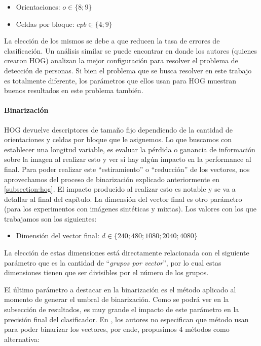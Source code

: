 	\begin{itemize}
		\item Orientaciones: $ o \in \{8; 9\}$
		\item Celdas por bloque: $ cpb \in \{4; 9\}$
	\end{itemize}
	
	La elección de los mismos se debe a que reducen la tasa de errores de clasificación. Un análisis similar se puede encontrar en \cite{DT05} donde los autores (quienes crearon HOG) analizan la mejor configuración para resolver el problema de detección de personas. Si bien el problema que se busca resolver en este trabajo es totalmente diferente, los parámetros que ellos usan para HOG muestran buenos resultados en este problema también.

	\paragraph{Binarización}

	HOG devuelve descriptores de tamaño fijo dependiendo de la cantidad de orientaciones y celdas por bloque que le asignemos. Lo que buscamos con establecer una longitud variable, es evaluar la pérdida o ganancia de información sobre la imagen al realizar esto y ver si hay algún impacto en la performance al final. Para poder realizar este ``estiramiento'' o ``reducción'' de los vectores, nos aprovechamos del proceso de binarización explicado anteriormente en \ref{subsection:hog}. El impacto producido al realizar esto es notable y se va a detallar al final del capítulo. La dimensión del vector final es otro parámetro (para los experimentos con imágenes sintéticas y mixtas). Los valores con los que trabajamos son los siguientes:

	\begin{itemize}
		\item Dimensión del vector final: $ d \in \{ 240; 480; 1080; 2040;  4080 \}$
	\end{itemize}
	
	La elección de estas dimensiones está directamente relacionada con el siguiente parámetro que es la cantidad de ``\textit{grupos por vector}'', por lo cual estas dimensiones tienen que ser divisibles por el número de los grupos.
	
	El último parámetro a destacar en la binarización es el método aplicado al momento de generar el umbral de binarización. Como se podrá ver en la subsección de resultados, es muy grande el impacto de este parámetro en la precisión final del clasificador. En \cite{wang}, los autores no especifican que método usan para poder binarizar los vectores, por ende, propusimos 4 métodos como alternativa:

